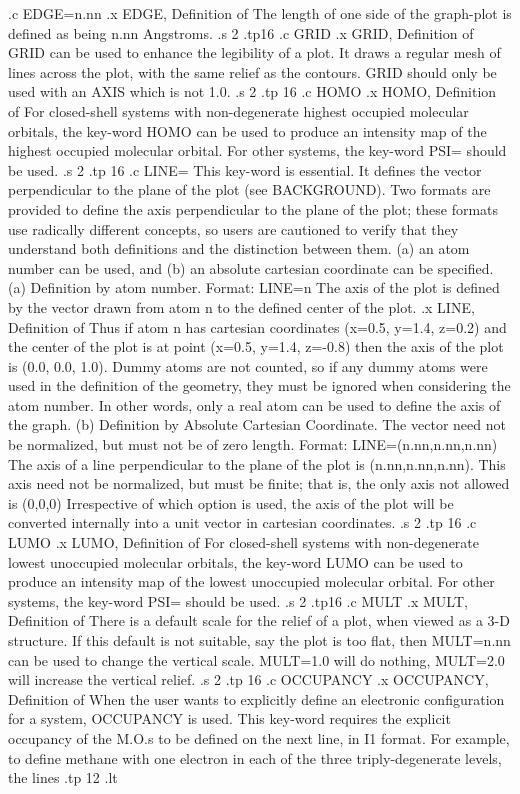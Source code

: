 .c
 EDGE=n.nn
.x EDGE, Definition of
 The length of one side of the graph-plot is defined as being n.nn 
Angstroms.
.s 2
.tp16
.c
 GRID
.x GRID, Definition of
 GRID can be used to enhance the legibility of a plot. It draws
a regular mesh of lines across the plot, with the same relief as the
contours. GRID should only be used with an AXIS which is not
1.0.
.s 2
.tp 16
.c
 HOMO        
.x HOMO, Definition of
 For closed-shell systems with non-degenerate highest occupied molecular
orbitals, the key-word HOMO can be used to produce an intensity
map of the highest occupied molecular orbital. For other systems, the
key-word PSI= should be used.
.s 2
.tp 16
.c
 LINE=
This key-word is essential. It defines the vector perpendicular to the plane
of the plot (see BACKGROUND). Two formats are provided to define the axis
perpendicular to the plane of the plot; these formats use radically different
concepts, so users are cautioned to verify that they understand both
definitions and the distinction between them.
(a) an atom number can be used, and (b) an absolute cartesian coordinate 
can be specified.
 (a) Definition by atom number.
 Format: LINE=n  The axis of the plot is defined by the vector drawn from 
atom n to the defined center of the plot.
.x LINE, Definition of
Thus if atom
n has cartesian coordinates (x=0.5, y=1.4, z=0.2) and the center of the plot
is at point (x=0.5, y=1.4, z=-0.8) then the axis of the plot
is (0.0, 0.0, 1.0). Dummy atoms are not counted, so if
any dummy atoms were used in the definition of the geometry, they must
be ignored when considering the atom number. In other words, only a real
atom can be used to define the axis of the graph.
 (b) Definition by Absolute Cartesian Coordinate. The vector need not be 
normalized, but must not be of zero length.
 Format: LINE=(n.nn,n.nn,n.nn) The axis of a line perpendicular to the
plane of the plot is (n.nn,n.nn,n.nn). This axis need not be normalized,
but must be finite; that is, the only axis not allowed is (0,0,0)
 Irrespective of which option is used, the axis of the plot will be
converted internally into a unit vector in cartesian coordinates.
.s 2
.tp 16
.c
 LUMO
.x LUMO, Definition of
 For closed-shell systems with non-degenerate lowest unoccupied molecular
orbitals, the key-word LUMO can be used to produce an intensity
map of the lowest unoccupied molecular orbital. For other systems, the
key-word PSI= should be used.
.s 2
.tp16
.c
 MULT
.x MULT, Definition of
 There is a default scale for the relief of a plot, when viewed as a
3-D structure. If this default is not suitable, say the plot is too flat,
then MULT=n.nn can be used to change the vertical scale. MULT=1.0 will
do nothing, MULT=2.0 will increase the vertical relief.
.s 2
.tp 16
.c
 OCCUPANCY   
.x OCCUPANCY, Definition of
 When the user wants to explicitly define an electronic configuration
for a system, OCCUPANCY is used. This key-word requires the explicit
occupancy of the M.O.s to be defined on the next line, in I1 format.
For example, to define methane with one electron in each of the three
triply-degenerate levels, the lines
.tp 12
.lt

